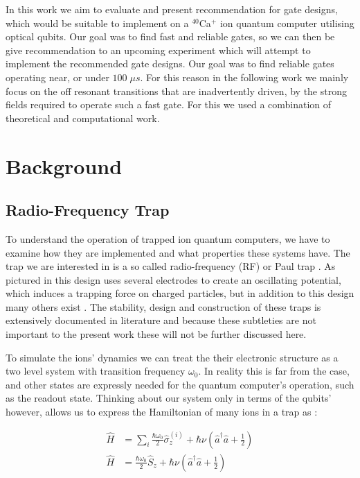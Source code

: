 \documentclass[12pt,twoside]{report}
\begin{document}
In this work we aim to evaluate and present recommendation for gate designs, which would be suitable to implement on a $^{40}$Ca$^+$ ion quantum computer utilising optical qubits. Our goal was to find fast and reliable gates, so we can then be give recommendation to an upcoming experiment which will attempt to implement the recommended gate designs. Our goal was to find reliable gates operating near, or under $100\;\mu s$. For this reason in the following work we mainly focus on the off resonant transitions that are inadvertently driven, by the strong fields required to operate such a fast gate. For this we used a combination of theoretical and computational work.

\chapter{Background}
\label{Background}

\section{Radio-Frequency Trap}
\label{Background:RF_Trap}

To understand the operation of trapped ion quantum computers, we have to examine how they are implemented and what properties these systems have. The trap we are interested in is a so called radio-frequency (RF) or Paul trap \cite{RF_Traps, Charged_Particle_traps_Paul}. As pictured in  this design uses several electrodes to create an oscillating potential, which induces a trapping force on charged particles, but in addition to this design many others exist \cite{Trapped_ion_rev}. The stability, design and construction of these traps is extensively documented in literature \cite{Charged_Particle_traps_Paul,RF_Traps} and because these subtleties are not important to the present work these will not be further discussed here.

To simulate the ions' dynamics we can treat the their electronic structure as a two level system with transition frequency $\omega_0$. In reality this is far from the case, and other states are expressly needed for the quantum computer's operation, such as the readout state. Thinking about our system only in terms of the qubits' however, allows us to express the Hamiltonian of many ions in a trap as \cite{RF_Traps}:

\begin{align}
	\hat{H} &= \sum_{i} \frac{\hbar \omega_0}{2}\hat{\sigma}_z^{\left(i\right)} + \hbar\nu\left(\hat{a}^\dagger\hat{a} + \frac{1}{2}\right)
	\label{eq:RF_Trap_H}\\
	\hat{H} &= \frac{\hbar \omega_0}{2}\hat{S}_z + \hbar\nu\left(\hat{a}^\dagger\hat{a} + \frac{1}{2}\right)
	\label{eq:RF_Trap_H_S}
\end{align}
\end{document}
